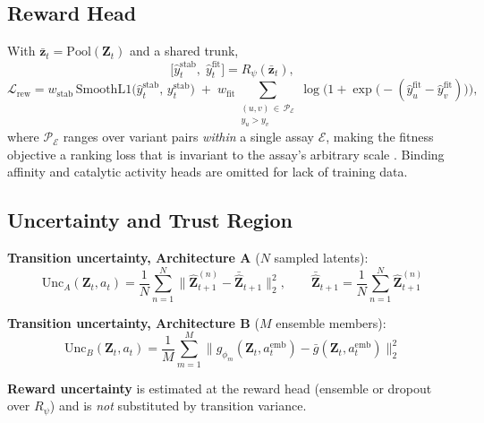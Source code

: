 \documentclass[12pt, a4paper]{article}
\begin{document}
\subsection{Reward Head}

With $\bar{\mathbf{z}}_t = \mathrm{Pool}(\mathbf{Z}_t)$ and a shared trunk,
\begin{equation}
    \big[\hat{y}^\text{stab}_t,\; \hat{y}^\text{fit}_t\big] = R_\psi(\bar{\mathbf{z}}_t),
\end{equation}
\begin{equation}
    \mathcal{L}_\text{rew} = w_\text{stab}\,\mathrm{SmoothL1}\big(\hat{y}^\text{stab}_t,\, y^\text{stab}_t\big) \;+\; w_\text{fit} \!\!\sum_{\substack{(u,v)\,\in\,\mathcal{P}_\mathcal{E} \\ y_u > y_v}} \!\! \log\Big(1 + \exp\big(-(\hat{y}^\text{fit}_u - \hat{y}^\text{fit}_v)\big)\Big),
\end{equation}
where $\mathcal{P}_\mathcal{E}$ ranges over variant pairs \textit{within} a single assay $\mathcal{E}$, making the fitness objective a ranking loss that is invariant to the assay's arbitrary scale \citep{tan2024rank}. Binding affinity and catalytic activity heads are omitted for lack of training data.

\subsection{Uncertainty and Trust Region}
\label{app:trust}

\noindent \textbf{Transition uncertainty, Architecture A} ($N$ sampled latents):
\begin{equation}
    \mathrm{Unc}_A(\mathbf{Z}_t, a_t) = \frac{1}{N}\sum_{n=1}^{N} \big\lVert \hat{\mathbf{Z}}_{t+1}^{(n)} - \bar{\hat{\mathbf{Z}}}_{t+1} \big\rVert_2^2, \qquad \bar{\hat{\mathbf{Z}}}_{t+1} = \frac{1}{N}\sum_{n=1}^{N} \hat{\mathbf{Z}}_{t+1}^{(n)}
\end{equation}

\noindent \textbf{Transition uncertainty, Architecture B} ($M$ ensemble members):
\begin{equation}
    \mathrm{Unc}_B(\mathbf{Z}_t, a_t) = \frac{1}{M}\sum_{m=1}^{M} \big\lVert g_{\phi_m}(\mathbf{Z}_t, a_t^\text{emb}) - \bar{g}(\mathbf{Z}_t, a_t^\text{emb}) \big\rVert_2^2
\end{equation}

\noindent \textbf{Reward uncertainty} is estimated at the reward head (ensemble or dropout over $R_\psi$) and is \textit{not} substituted by transition variance.
\end{document}
